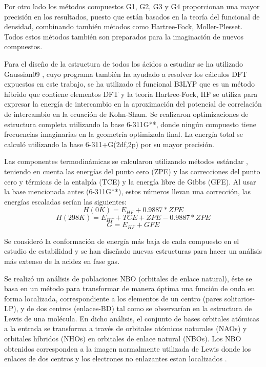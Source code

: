 Por otro lado los métodos compuestos G1, G2, G3 y G4 \cite{quimica11} proporcionan una mayor precisión en los resultados, puesto que están basados en la teoría del funcional de densidad, combinando también métodos como Hartree-Fock, Moller-Plesset.
Todos estos métodos también son preparados para la imaginación de nuevos compuestos.

Para el diseño de la estructura de todos los ácidos a estudiar se ha utilizado Gaussian09 \cite{Gaussian}, cuyo programa también ha ayudado a resolver los cálculos DFT expuestos en este trabajo, se ha utilizado el funcional B3LYP \cite{quimica10} \cite{quimica9} que es un método híbrido que contiene elementos DFT y la teoría Hartree-Fock, HF se utiliza para expresar la energía de intercambio en la aproximación del potencial de correlación de intercambio en la ecuación de Kohn-Sham. Se realizaron optimizaciones de estructura completa utilizando la base 6-311G**, donde ningún compuesto tiene frecuencias imaginarias en la geometría optimizada final. La energía total se calculó utilizando la base 6-311+G(2df,2p) por su mayor precisión.


Las componentes termodinámicas se calcularon utilizando métodos estándar \cite {quimica4}, teniendo en cuenta las energías del punto cero (ZPE) y las correcciones del punto cero y térmicas de la entalpía (TCE) y la energía libre de Gibbs (GFE). Al usar la base mencionada antes (6-311G**), estos números llevan una corrección, las energías escaladas serían las siguientes: \\
$$ H (0K) = E_{HF} + 0.9887*ZPE $$ 
$$ H (298K) = E_{HF} + TCE + ZPE - 0.9887*ZPE $$ 
$$G = E_{HF} + GFE $$

Se consideró la conformación de energía más baja de cada compuesto en el estudio de estabilidad y se han diseñado nuevas estructuras para hacer un análisis más extenso de la acidez en fase gas.

Se realizó un análisis de poblaciones NBO (orbitales de enlace natural), éste se basa en un método para transformar de manera óptima una función de onda en forma localizada, correspondiente a los elementos de un centro (pares solitarios-LP), y de dos centros (enlaces-BD) tal como se observarían en la estructura de Lewis de una molécula. En dicho análisis, el conjunto de bases orbitales atómicas a la entrada se transforma a través de orbitales atómicos naturales (NAOs) y orbitales híbridos (NHOs) en orbitales de enlace natural (NBOs). Los NBO obtenidos corresponden a la imagen normalmente utilizada de Lewis donde los enlaces de dos centros y los electrones no enlazantes estan localizados \cite{quimica5} \cite{quimica8}.

